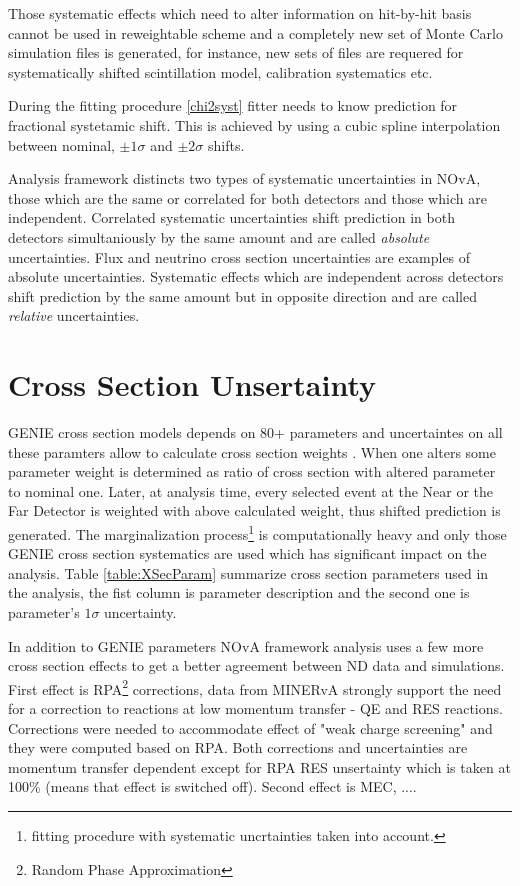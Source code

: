 Those systematic effects which need to alter information on hit-by-hit basis cannot be used in reweightable scheme 
and a completely new set of Monte Carlo simulation files is generated, for instance, new sets of files are requered for 
systematically shifted scintillation model, calibration systematics etc. 

During the fitting procedure \ref{chi2syst} fitter needs to know prediction for fractional systetamic shift. This is 
achieved by using a cubic spline interpolation between nominal, $\pm 1\sigma$ and $\pm 2\sigma$ shifts. 

Analysis framework distincts two types of systematic uncertainties in NOvA, those which are the same or correlated for 
both detectors and those which are independent. Correlated systematic uncertainties shift prediction in both detectors
simultaniously by the same amount and are called \textit{absolute} uncertainties. Flux and neutrino cross section 
uncertainties are examples of absolute uncertainties. Systematic effects which are independent across detectors 
shift prediction by the same amount but in opposite direction and are called \textit{relative} uncertainties.  

\section{Cross Section Unsertainty}
GENIE cross section models depends on 80+ parameters and uncertaintes on all these paramters allow to calculate cross
section weights \cite{GENIE}. When one alters some parameter weight is determined as ratio of cross section with altered 
parameter to nominal one. Later, at analysis time, every selected event at the Near or the Far Detector is weighted with 
above calculated weight, thus shifted prediction is generated. The marginalization process\footnote{fitting procedure with 
systematic uncrtainties taken into account.} is computationally heavy and only those GENIE cross section systematics are 
used which has significant impact on the analysis. Table \ref{table:XSecParam} summarize cross section parameters used in
the analysis, the fist column is parameter description and the second one is parameter's $1\sigma$ uncertainty. 

In addition to GENIE parameters NOvA framework analysis uses a few more cross section effects to get a better agreement 
between ND data and simulations. First effect is RPA\footnote{Random Phase Approximation} corrections, data from MINERvA 
\cite{MINERvA} strongly support the need for a correction to reactions at low momentum transfer - QE and RES reactions. 
Corrections were needed to accommodate effect of "weak charge screening" and they were computed based on RPA. Both corrections 
and uncertainties are momentum transfer dependent except for RPA RES unsertainty which is taken at 100\% (means that effect 
is switched off). Second effect is MEC, .... 


